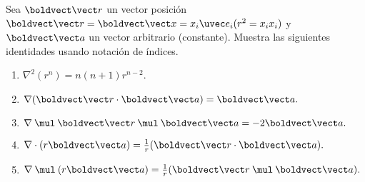 \documentclass[../main.tex]{subfiles}
\begin{document}
\begin{problema}
	Sea \(\vb{r}\) un vector posición \(\vb{r} = \vb{x} = x_{i}\eu{i}(r^{2} = x_{i}x_{i})\)
	y \(\vb{a}\) un vector arbitrario (constante).
	Muestra las siguientes identidades usando notación de índices.

	\begin{enumerate}
		\item \(\nabla^{2}(r^{n}) = n(n + 1)r^{n - 2}\).
		\item \(\nabla(\dotp{\vb{r}}{\vb{a}}) = \vb{a}.\)
		\item \(\crossp{\nabla}{\crossp{\vb{r}}{\vb{a}}} = -2\vb{a}.\)
		\item \(\dotp{\nabla}{(r\vb{a})} = \tfrac{1}{r}(\dotp{\vb{r}}{\vb{a}}).\)
		\item \(\crossp{\nabla}{(r\vb{a})} = \tfrac{1}{r}(\crossp{\vb{r}}{\vb{a}}).\)
	\end{enumerate}
\end{problema}
\end{document}
